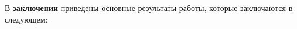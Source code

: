 \FloatBarrier
{}                                  %
В \underline{\textbf{заключении}} приведены основные результаты работы, которые заключаются в следующем:


